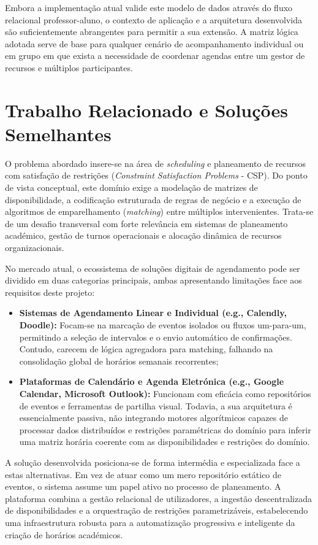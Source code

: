 Embora a implementação atual valide este modelo de dados através do fluxo relacional professor-aluno, o contexto de aplicação e a arquitetura desenvolvida são suficientemente abrangentes para permitir a sua extensão. A matriz lógica adotada serve de base para qualquer cenário de acompanhamento individual ou em grupo em que exista a necessidade de coordenar agendas entre um gestor de recursos e múltiplos participantes.

\section{Trabalho Relacionado e Soluções Semelhantes}

O problema abordado insere-se na área de \textit{scheduling} e planeamento de recursos com satisfação de restrições (\textit{Constraint Satisfaction Problems} - CSP). Do ponto de vista conceptual, este domínio exige a modelação de matrizes de disponibilidade, a codificação estruturada de regras de negócio e a execução de algoritmos de emparelhamento (\textit{matching}) entre múltiplos intervenientes. Trata-se de um desafio transversal com forte relevância em sistemas de planeamento académico, gestão de turnos operacionais e alocação dinâmica de recursos organizacionais.

No mercado atual, o ecossistema de soluções digitais de agendamento pode ser dividido em duas categorias principais, ambas apresentando limitações face aos requisitos deste projeto:

\begin{itemize}
    \item \textbf{Sistemas de Agendamento Linear e Individual (e.g., Calendly, Doodle):} Focam-se na marcação de eventos isolados ou fluxos um-para-um, permitindo a seleção de intervalos e o envio automático de confirmações. Contudo, carecem de lógica agregadora para matching, falhando na consolidação global de horários semanais recorrentes;
    \item \textbf{Plataformas de Calendário e Agenda Eletrónica (e.g., Google Calendar, Microsoft Outlook):} Funcionam com eficácia como repositórios de eventos e ferramentas de partilha visual. Todavia, a sua arquitetura é essencialmente passiva, não integrando motores algorítmicos capazes de processar dados distribuídos e restrições paramétricas do domínio para inferir uma matriz horária coerente com as disponibilidades e restrições do domínio.
\end{itemize}

A solução desenvolvida posiciona-se de forma intermédia e especializada face a estas alternativas. Em vez de atuar como um mero repositório estático de eventos, o sistema assume um papel ativo no processo de planeamento. A plataforma combina a gestão relacional de utilizadores, a ingestão descentralizada de disponibilidades e a orquestração de restrições parametrizáveis, estabelecendo uma infraestrutura robusta para a automatização progressiva e inteligente da criação de horários académicos.


